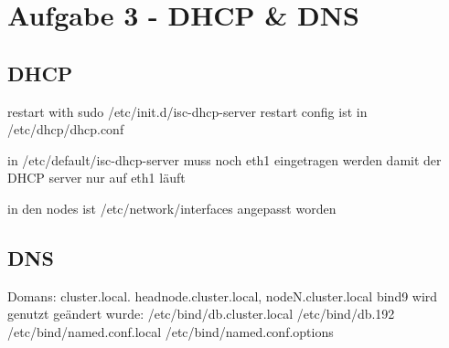 \chapter{Aufgabe 3 - DHCP \& DNS}
\section{DHCP}
restart with
sudo /etc/init.d/isc-dhcp-server restart
config ist in /etc/dhcp/dhcp.conf

in /etc/default/isc-dhcp-server muss noch eth1 eingetragen werden damit der DHCP server nur auf eth1 läuft

in den nodes ist /etc/network/interfaces angepasst worden

\section{DNS}
Domans: cluster.local. headnode.cluster.local, nodeN.cluster.local
bind9 wird genutzt
geändert wurde:
/etc/bind/db.cluster.local
/etc/bind/db.192
/etc/bind/named.conf.local
/etc/bind/named.conf.options
